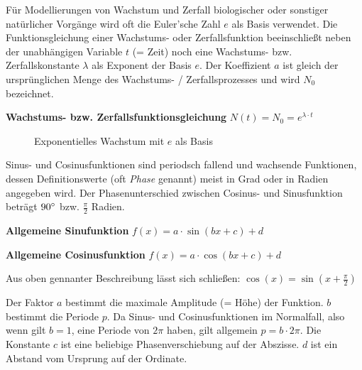 \pagebreak

F\"{u}r Modellierungen von Wachstum und Zerfall biologischer oder sonstiger nat\"{u}rlicher Vorg\"{a}nge wird oft die Euler'sche Zahl $e$ als Basis verwendet. Die Funktionsgleichung einer Wachstums- oder Zerfallsfunktion beeinschlie\ss{}t neben der unabh\"{a}ngigen Variable $t$ (= Zeit) noch eine Wachstums- bzw. Zerfallskonstante $\lambda$ als Exponent der Basis $e$. Der Koeffizient $a$ ist gleich der urspr\"{u}nglichen Menge des Wachstums- / Zerfallsprozesses und wird $N_{0}$ bezeichnet. 

\textbf{Wachstums- bzw. Zerfallsfunktionsgleichung}  $N(t) = N_{0} = e^{\lambda \cdot t}$

\begin{figure}[h!]
\centering
\caption{Exponentielles Wachstum mit $e$ als Basis}
\end{figure}

\pagebreak


Sinus- und Cosinusfunktionen sind periodsch fallend und wachsende Funktionen, dessen Definitionswerte (oft \emph{Phase} genannt) meist in Grad oder in Radien angegeben wird. Der Phasenunterschied zwischen Cosinus- und Sinusfunktion betr\"{a}gt $90\degree$ bzw. $\frac{\pi}{2}$ Radien.

\textbf{Allgemeine Sinufunktion}  $f(x) = a \cdot \sin(bx + c) + d$

\textbf{Allgemeine Cosinusfunktion}  $f(x) = a \cdot \cos(bx + c) + d$

Aus oben gennanter Beschreibung l\"{a}sst sich schlie\ss{}en: $\cos(x) = \sin(x + \frac{\pi}{2})$

Der Faktor $a$ bestimmt die maximale Amplitude (= H\"{o}he) der Funktion. $b$ bestimmt die Periode $p$. Da Sinus- und Cosinusfunktionen im Normalfall, also wenn gilt $b=1$, eine Periode von $2\pi$ haben, gilt allgemein $p = b \cdot 2\pi$. Die Konstante $c$ ist eine beliebige Phasenverschiebung auf der Abszisse. $d$ ist ein Abstand vom Ursprung auf der Ordinate.


